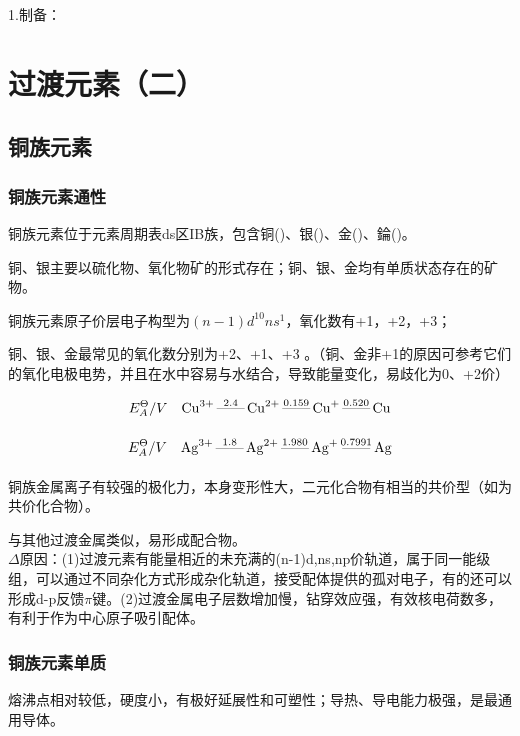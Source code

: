 \documentclass[a4paper,UTF8]{article}
\begin{document}
1.制备：




\section{过渡元素（二）}

\subsection{铜族元素}

\subsubsection{铜族元素通性}

铜族元素位于元素周期表ds区IB族，包含铜()、银()、金()、錀()。

铜、银主要以硫化物、氧化物矿的形式存在；铜、银、金均有单质状态存在的矿物。

铜族元素原子价层电子构型为$(n-1)d^{10}ns^{1}$，氧化数有+1，+2，+3；

铜、银、金最常见的氧化数分别为+2、+1、+3 。（铜、金非+1的原因可参考它们的氧化电极电势，并且在水中容易与水结合，导致能量变化，易歧化为0、+2价）

$$ E^{\Theta}_{A}/V \quad \ce{Cu^{3+} \overset{2.4}{\text{------}} Cu^{2+} \overset{0.159}{\underset{}{\text{------}}} Cu+ \overset{0.520}{\underset{}{\text{------}}} Cu}$$

$$ E^{\Theta}_{A}/V  \quad \ce{Ag^{3+} \overset{1.8}{\underset{}{\text{------}}} Ag^{2+} \overset{1.980}{\underset{}{\text{------}}} Ag+ \overset{0.7991}{\underset{}{\text{------}}} Ag} $$




铜族金属离子有较强的极化力，本身变形性大，二元化合物有相当的共价型（如为共价化合物）。

与其他过渡金属类似，易形成配合物。\\$\Delta$原因：(1)过渡元素有能量相近的未充满的(n-1)d,ns,np价轨道，属于同一能级组，可以通过不同杂化方式形成杂化轨道，接受配体提供的孤对电子，有的还可以形成d-p反馈$\pi$键。(2)过渡金属电子层数增加慢，钻穿效应强，有效核电荷数多，有利于作为中心原子吸引配体。

\subsubsection{铜族元素单质}
熔沸点相对较低，硬度小，有极好延展性和可塑性；导热、导电能力极强，是最通用导体。
\end{document}
